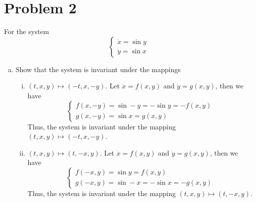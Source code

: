 \documentclass[12pt]{exam}
\begin{document}
\section*{Problem 2}
For the system
\[ \begin{cases} \dot{x} = \sin y \\ \dot{y} = \sin x \end{cases} \]
\begin{enumerate}[(a)]
	\item Show that the system is invariant under the mappings
	
	\begin{enumerate}[(i)]
		\item  $(t, x, y) \mapsto (-t, x, -y)$. Let $\dot{x} = f(x,y)$ and $\dot{y} = g(x,y)$, then we have 
		\[ \begin{cases} f(x,-y) = \sin -y =- \sin y = -f(x,y) \\ g(x,-y) = \sin x = g(x,y) \end{cases} \]
		Thus, the system is invariant under the mapping $(t, x, y) \mapsto (-t, x, -y)$.
	
		\item $(t, x, y) \mapsto (t, -x, y)$. Let $\dot{x} = f(x,y)$ and $\dot{y} = g(x,y)$, then we have
		\[ \begin{cases} f(-x,y) = \sin y = f(x,y) \\ g(-x,y) = \sin -x = -\sin x = -g(x,y) \end{cases} \]
		Thus, the system is invariant under the mapping $(t, x, y) \mapsto (t, -x, y)$.
	\end{enumerate}


\end{enumerate}
\end{document}
